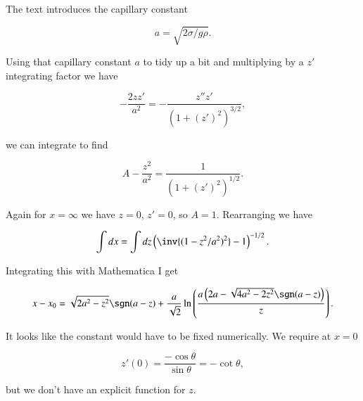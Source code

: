 \begin{Answer}[ref={problem:fluids:review:q3}]
The text introduces the capillary constant

\begin{equation}\label{eqn:continuumFluidsReview:1730}
a = \sqrt{2 \sigma/ g \rho}.
\end{equation}

Using that capillary constant $a$ to tidy up a bit and multiplying by a $z'$ integrating factor we have

\begin{equation}\label{eqn:continuumFluidsReview:1750}
-\frac{2 z z'}{a^2} = -\frac{z'' z'}{(1 + (z')^2)^{3/2}},
\end{equation}

we can integrate to find

\begin{equation}\label{eqn:continuumFluidsReview:1770}
A - \frac{z^2}{a^2} = \frac{1}{(1 + (z')^2)^{1/2}}.
\end{equation}

Again for $x = \infty$ we have $z = 0$, $z' = 0$, so $A = 1$.  Rearranging we have

\begin{equation}\label{eqn:continuumFluidsReview:1790}
\int dx = \int dz \left( \inv{(1 - z^2/a^2)^2} - 1 \right)^{-1/2}.
\end{equation}

Integrating this with Mathematica I get

\begin{equation}\label{eqn:continuumFluidsReview:1810}
x - x_0 =
\sqrt{2 a^2-z^2} \sgn(a-z)+ \frac{a}{\sqrt{2}} \ln \left(\frac{a \left(2 a-\sqrt{4 a^2-2 z^2} \sgn(a-z)\right)}{z}\right).
\end{equation}

It looks like the constant would have to be fixed numerically.  We require at $x = 0$

\begin{equation}\label{eqn:continuumFluidsReview:1830}
z'(0) = \frac{-\cos\theta}{\sin\theta} = -\cot \theta,
\end{equation}

but we don't have an explicit function for $z$.
\end{Answer}

